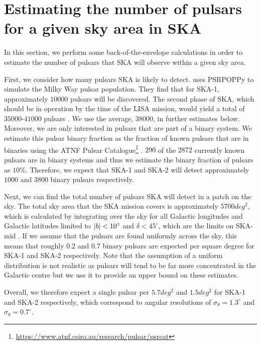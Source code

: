 \section{Estimating the number of pulsars for a given sky area in SKA}\label{app:ska_area}

In this section, we perform some back-of-the-envelope calculations in order to estimate the number of pulsars that SKA will observe within a given sky area.

First, we consider how many pulsars SKA is likely to detect. \citet{Keane+2015} uses PSRPOPPy \citep{Bates+2014} to simulate the Milky Way pulsar population. They find that for SKA-1, approximately $10000$ pulsars will be discovered. The second phase of SKA, which should be in operation by the time of the LISA mission, would yield a total of $35000$-$41000$ pulsars \citep{Keane+2015}. We use the average, $38000$, in further estimates below. Moreover, we are only interested in pulsars that are part of a binary system. We estimate this pulsar binary fraction as the fraction of known pulsars that are in binaries using the ATNF Pulsar Catalogue\footnote{\url{https://www.atnf.csiro.au/research/pulsar/psrcat}} \citep{Manchester+2005}. $290$ of the $2872$ currently known pulsars are in binary systems and thus we estimate the binary fraction of pulsars as $10\%$. Therefore, we expect that SKA-1 and SKA-2 will detect approximately $1000$ and $3800$ binary pulsars respectively.

Next, we can find the total number of pulsars SKA will detect in a patch on the sky. The total sky area that the SKA mission covers is approximately $5700 \unit{deg^2}$, which is calculated by integrating over the sky for all Galactic longitudes and Galactic latitudes limited to $\abs{b} < 10^\circ$ and $\delta < 45^\circ$, which are the limits on SKA-mid \citep{Keane+2015}. If we assume that the pulsars are found uniformly across the sky, this means that roughly $0.2$ and $0.7$ binary pulsars are expected per square degree for SKA-1 and SKA-2 respectively. Note that the assumption of a uniform distribution is not realistic as pulsars will tend to be far more concentrated in the Galactic centre but we use it to provide an upper bound on these estimates.

Overall, we therefore expect a single pulsar per $5.7 \unit{deg^2}$ and $1.5 \unit{deg^2}$ for SKA-1 and SKA-2 respectively, which correspond to angular resolutions of $\sigma_\theta = 1.3^\circ$ and $\sigma_\theta = 0.7^\circ$.

\clearpage
\onecolumngrid


